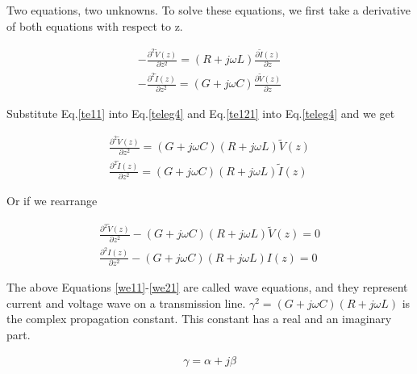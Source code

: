\documentclass{ximera}
\begin{document}
Two equations, two unknowns. To solve these equations, we first
take a derivative of both equations with respect to z. 

\begin{eqnarray}
-\frac{\partial^2 \tilde{V}(z)}{\partial z^2}=  (R+j\omega L) \frac{\partial
 \tilde{I}(z)}{\partial z}  \label{teleg3} \\
-\frac{\partial^2 \tilde{I}(z)}{\partial z^2}=  (G+j\omega C) \frac{\partial
 \tilde{V}(z)}{\partial z} \label{teleg4}
\end{eqnarray}





Substitute  Eq.\ref{te11} into  Eq.\ref{teleg4}
and Eq.\ref{te121} into Eq.\ref{teleg4} and we get

\begin{eqnarray}
\frac{\partial^2 \tilde{V}(z)}{\partial z^2}=(G+j\omega C)(R+j\omega L) \tilde{V}(z) \label{teleg1} \\
\frac{\partial^2 \tilde{I}(z)}{\partial z^2}= (G+j\omega C)  (R+j\omega L) \label{teleg2}
\tilde{I}(z) 
\end{eqnarray}

Or if we rearrange


\begin{eqnarray}
\frac{\partial^2 \tilde{V}(z)}{\partial z^2} -(G+j\omega C)(R+j\omega L)
 \tilde{V}(z)=0  \label{we11} \\ 
\frac{\partial^2 I(z)}{\partial z^2}- (G+j\omega C)  (R+j\omega L)
I(z)=0 \label{we21}
\end{eqnarray}

The above Equations \ref{we11}-\ref{we21} are called wave equations, and they represent
current and voltage wave on a transmission line. 
 $\gamma^2=(G+j\omega
C)(R+j\omega L)$ is the complex propagation constant. This constant
has a real and an imaginary part.

\begin{eqnarray}
\gamma= \alpha + j \beta \nonumber
\end{eqnarray}
\end{document}
